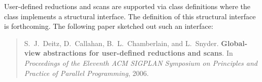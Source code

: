 \label{User_Defined_Reductions_and_Scans}

User-defined reductions and scans are supported via class definitions
where the class implements a structural interface.  The definition of
this structural interface is forthcoming.  The following paper
sketched out such an interface:
\begin{quote}
S.~J.~Deitz, D.~Callahan, B.~L.~Chamberlain, and L.~Snyder.  {\bf
Global-view abstractions for user-defined reductions and scans}.  In
{\it Proceedings of the Eleventh ACM SIGPLAN Symposium on Principles
and Practice of Parallel Programming}, 2006.
\end{quote}
